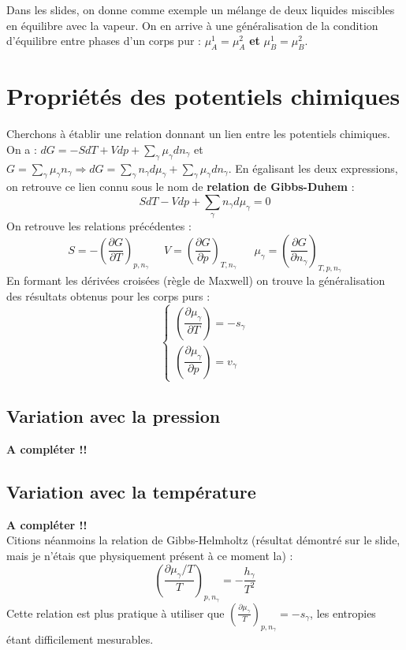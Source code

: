\documentclass[british,french,11pt, a4paper, openany]{book}
\begin{document}
	Dans les slides, on donne comme exemple un mélange de deux liquides miscibles en équilibre avec la vapeur. On en arrive à une généralisation de la condition d'équilibre entre phases d'un corps pur : $\mu_A^1 = \mu_A^2$ \textbf{et} $\mu_B^1 = \mu_B^2$.
	
	\section{Propriétés des potentiels chimiques}
	Cherchons à établir une relation donnant un lien entre les potentiels chimiques. On a : $dG = -S dT + V dp + \sum_\gamma \mu_\gamma dn_\gamma$ et $G = \sum_\gamma \mu_\gamma n_\gamma \Rightarrow dG = \sum_\gamma n_\gamma d\mu_\gamma + \sum_\gamma \mu_\gamma dn_\gamma$. En égalisant les deux expressions, on retrouve ce lien connu sous le nom de \textbf{relation de Gibbs-Duhem} :
	\begin{equation}
	SdT - Vdp + \sum_\gamma n_\gamma d\mu_\gamma = 0
	\end{equation}
	On retrouve les relations précédentes :
	\begin{equation}
	S = - \left(\frac{\partial G}{\partial T}\right)_{p, n_\gamma}\ \ \ \ \ \  V =  \left(\frac{\partial G}{\partial p}\right)_{T, n_\gamma}\ \ \ \ \ \ \ \mu_\gamma = \left(\frac{\partial G}{\partial n_\gamma}\right)_{T, p, n_\gamma}
	\end{equation}
	En formant les dérivées croisées (règle de Maxwell) on trouve la généralisation des résultats obtenus pour les corps purs :
	\begin{equation}
	\left\{\begin{array}{l}
	\left( \dfrac{\partial \mu_\gamma}{\partial T} \right) = -s_\gamma\\
	\left( \dfrac{\partial \mu_\gamma}{\partial p} \right) = v_\gamma
	\end{array}\right.
	\end{equation}
	\subsection{Variation avec la pression}
	\textbf{A compléter !!}
	
	\subsection{Variation avec la température}
	\textbf{A compléter !!}\\
	Citions néanmoins la relation de Gibbs-Helmholtz (résultat démontré sur le slide, mais je n'étais que physiquement présent à ce moment la) :
	\begin{equation}
	\left(\frac{\partial \mu_\gamma/T}{T}\right)_{p, n_\gamma} = -\frac{h_\gamma}{T^2}
	\end{equation}
	Cette relation est plus pratique à utiliser que $\left(\frac{\partial \mu_\gamma}{T}\right)_{p, n_\gamma} = -s_\gamma$, les entropies étant difficilement mesurables.
	
\end{document}
